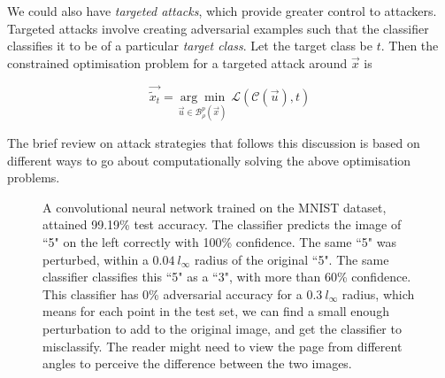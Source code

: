\documentclass{ociamthesis}
\begin{document}
We could also have \emph{targeted attacks}, which provide greater control to
attackers. Targeted attacks involve creating adversarial examples such that the
classifier classifies it to be of a particular \emph{target class}. Let the
target class be $t$. Then the constrained optimisation problem for a targeted
attack around $\vec{x}$ is

\begin{equation*}
    \vec{\tilde{x}_t} = \underset{\vec{u} \in \mathcal{B}_\rho^p(\vec{x})}
    {\arg\min}~\mathcal{L}(\mathcal{C}(\vec{u}), t)
\end{equation*}


The brief review on attack strategies that follows this discussion is based on
different ways to go about computationally solving the above optimisation
problems.



\begin{figure}[!h]
    \centering
    \qquad
     \caption{A
    convolutional neural network trained on the MNIST dataset, attained 99.19\%
    test accuracy. The classifier predicts the image of ``5" on the left
    correctly with 100\% confidence. The same ``5" was perturbed, within a
    $0.04~l_\infty$ radius of the original ``5". The same classifier classifies
    this ``5" as a ``3", with more than 60\% confidence. This classifier has 0\%
    adversarial accuracy for a $0.3~l_\infty$ radius, which means for each point
    in the test set, we can find a small enough perturbation to add to the
    original image, and get the classifier to misclassify. The reader might need
    to view the page from different angles to perceive the difference between
    the two images.}
    \label{fig:adversarial-example-5}
\end{figure}
\end{document}
